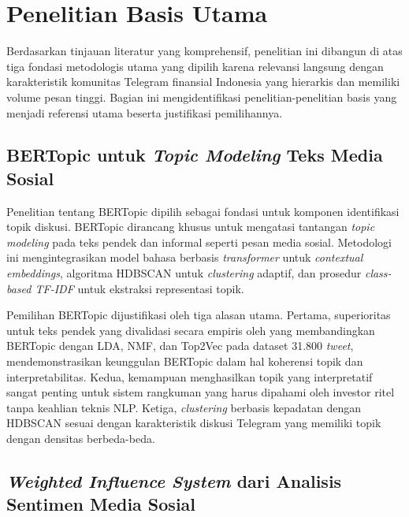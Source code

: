 
\section{Penelitian Basis Utama}
\label{sec:research-foundation}

Berdasarkan tinjauan literatur yang komprehensif, penelitian ini dibangun di atas tiga fondasi metodologis utama yang dipilih karena relevansi langsung dengan karakteristik komunitas Telegram finansial Indonesia yang hierarkis dan memiliki volume pesan tinggi. Bagian ini mengidentifikasi penelitian-penelitian basis yang menjadi referensi utama beserta justifikasi pemilihannya.

\subsection{BERTopic untuk \textit{Topic Modeling} Teks Media Sosial}

Penelitian \textcite{grootendorst2022} tentang BERTopic dipilih sebagai fondasi untuk komponen identifikasi topik diskusi. BERTopic dirancang khusus untuk mengatasi tantangan \textit{topic modeling} pada teks pendek dan informal seperti pesan media sosial. Metodologi ini mengintegrasikan model bahasa berbasis \textit{transformer} untuk \textit{contextual embeddings}, algoritma HDBSCAN untuk \textit{clustering} adaptif, dan prosedur \textit{class-based TF-IDF} untuk ekstraksi representasi topik.

Pemilihan BERTopic dijustifikasi oleh tiga alasan utama. Pertama, superioritas untuk teks pendek yang divalidasi secara empiris oleh \textcite{egger2022} yang membandingkan BERTopic dengan LDA, NMF, dan Top2Vec pada dataset 31.800 \textit{tweet}, mendemonstrasikan keunggulan BERTopic dalam hal koherensi topik dan interpretabilitas. Kedua, kemampuan menghasilkan topik yang interpretatif sangat penting untuk sistem rangkuman yang harus dipahami oleh investor ritel tanpa keahlian teknis NLP. Ketiga, \textit{clustering} berbasis kepadatan dengan HDBSCAN sesuai dengan karakteristik diskusi Telegram yang memiliki topik dengan densitas berbeda-beda.

\subsection{\textit{Weighted Influence System} dari Analisis Sentimen Media Sosial}

